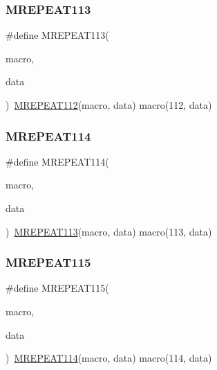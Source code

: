 \mbox{\label{group__group__sam0__utils__mrepeat_ga41f4b4f9d9ce5b392cfa10804e69b163}} 
\subsubsection{\texorpdfstring{MREPEAT113}{MREPEAT113}}
{\footnotesize\ttfamily \#define M\+R\+E\+P\+E\+A\+T113(\begin{DoxyParamCaption}\item[{}]{macro,  }\item[{}]{data }\end{DoxyParamCaption})~\mbox{\hyperlink{group__group__sam0__utils__mrepeat_ga9e7619019279e0bb7b52e9825bac227d}{M\+R\+E\+P\+E\+A\+T112}}(macro, data)   macro(112, data)}

\mbox{\label{group__group__sam0__utils__mrepeat_gab7df5ef1e6f0f3980e9e94b701ecd4dd}} 
\subsubsection{\texorpdfstring{MREPEAT114}{MREPEAT114}}
{\footnotesize\ttfamily \#define M\+R\+E\+P\+E\+A\+T114(\begin{DoxyParamCaption}\item[{}]{macro,  }\item[{}]{data }\end{DoxyParamCaption})~\mbox{\hyperlink{group__group__sam0__utils__mrepeat_ga41f4b4f9d9ce5b392cfa10804e69b163}{M\+R\+E\+P\+E\+A\+T113}}(macro, data)   macro(113, data)}

\mbox{\label{group__group__sam0__utils__mrepeat_ga065e40294f3d496aa0d661ef472f7914}} 
\subsubsection{\texorpdfstring{MREPEAT115}{MREPEAT115}}
{\footnotesize\ttfamily \#define M\+R\+E\+P\+E\+A\+T115(\begin{DoxyParamCaption}\item[{}]{macro,  }\item[{}]{data }\end{DoxyParamCaption})~\mbox{\hyperlink{group__group__sam0__utils__mrepeat_gab7df5ef1e6f0f3980e9e94b701ecd4dd}{M\+R\+E\+P\+E\+A\+T114}}(macro, data)   macro(114, data)}

